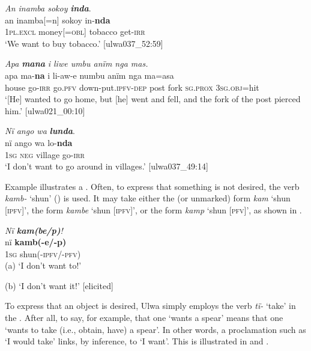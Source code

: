 \ea%
    \label{ex:syntax:389}
          \textit{An inamba sokoy} \textbf{\textit{inda}}.\\
\gll an      inamba[=n]  sokoy    in-\textbf{nda}\\
    1\textsc{pl.excl}  money[=\textsc{obl]}  tobacco  get-\textsc{irr}\\
\glt `We want to buy tobacco.’ [ulwa037\_52:59]
\z

\ea%
    \label{ex:syntax:390}
          \textit{Apa} \textbf{\textit{mana}} \textit{i liwe umbu anïm nga mas.}\\
\gll    apa    ma-\textbf{na}  i    li-aw-e          numbu  anïm  nga ma=asa\\
    house  go-\textsc{irr}  go.\textsc{pfv}  down{}-put.\textsc{ipfv-dep}  post  fork  \textsc{sg.prox}    3\textsc{sg.obj}=hit\\
\glt `[He] wanted to go home, but [he] went and fell, and the fork of the post pierced him.’ [ulwa021\_00:10]
\z

\ea%
    \label{ex:syntax:391}
          \textit{Nï ango wa} \textbf{\textit{lunda}}.\\
\gll nï    ango  wa    lo-\textbf{nda}\\
    1\textsc{sg}  \textsc{neg}  village  go-\textsc{irr}\\
\glt `I don’t want to go around in villages.’ [ulwa037\_49:14]
\z

Example  illustrates a . Often, to express that something is not desired, the verb \textit{kamb-} ‘shun’ () is used. It may take either the  (or unmarked) form \textit{kam} ‘shun [\textsc{ipfv}]’, the  form \textit{kambe} ‘shun [\textsc{ipfv]’}, or the  form \textit{kamp} ‘shun [\textsc{pfv]’}, as shown in .

\ea%
    \label{ex:syntax:392}
          \textit{Nï \textbf{kam(be/p)}!}\\
\gll    nï    \textbf{kamb({}-e/-p)}\\
    1\textsc{sg}  shun(-\textsc{ipfv}/-\textsc{pfv)}\\
\glt    (a) ‘I don’t want to!’

    (b) ‘I don’t want it!’ [elicited]
\z

To express that an object is desired, Ulwa simply employs the verb \textit{tï-} ‘take’ in the  . After all, to say, for example, that one ‘wants a spear’ means that one ‘wants to take (i.e., obtain, have) a spear’. In other words, a proclamation such as ‘I would take’ links, by inference, to ‘I want’. This is illustrated in  and .

